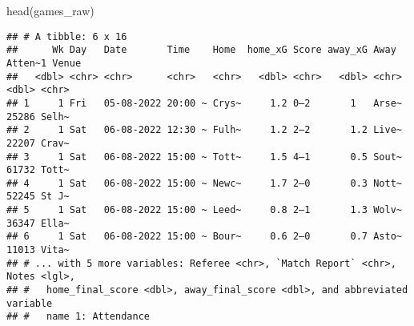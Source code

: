 \documentclass[
]{article}
\newenvironment{Shaded}{\begin{snugshade}}{\end{snugshade}}
\newcommand{\AttributeTok}[1]{\textcolor[rgb]{0.77,0.63,0.00}{#1}}
\newcommand{\FunctionTok}[1]{\textcolor[rgb]{0.00,0.00,0.00}{#1}}
\newcommand{\NormalTok}[1]{#1}
\newcommand{\OtherTok}[1]{\textcolor[rgb]{0.56,0.35,0.01}{#1}}
\newcommand{\SpecialCharTok}[1]{\textcolor[rgb]{0.00,0.00,0.00}{#1}}
\newcommand{\StringTok}[1]{\textcolor[rgb]{0.31,0.60,0.02}{#1}}
\begin{document}
\begin{Shaded}
\begin{Highlighting}[]
\FunctionTok{head}\NormalTok{(games\_raw)}
\end{Highlighting}
\end{Shaded}

\begin{verbatim}
## # A tibble: 6 x 16
##      Wk Day   Date       Time    Home  home_xG Score away_xG Away  Atten~1 Venue
##   <dbl> <chr> <chr>      <chr>   <chr>   <dbl> <chr>   <dbl> <chr>   <dbl> <chr>
## 1     1 Fri   05-08-2022 20:00 ~ Crys~     1.2 0–2       1   Arse~   25286 Selh~
## 2     1 Sat   06-08-2022 12:30 ~ Fulh~     1.2 2–2       1.2 Live~   22207 Crav~
## 3     1 Sat   06-08-2022 15:00 ~ Tott~     1.5 4–1       0.5 Sout~   61732 Tott~
## 4     1 Sat   06-08-2022 15:00 ~ Newc~     1.7 2–0       0.3 Nott~   52245 St J~
## 5     1 Sat   06-08-2022 15:00 ~ Leed~     0.8 2–1       1.3 Wolv~   36347 Ella~
## 6     1 Sat   06-08-2022 15:00 ~ Bour~     0.6 2–0       0.7 Asto~   11013 Vita~
## # ... with 5 more variables: Referee <chr>, `Match Report` <chr>, Notes <lgl>,
## #   home_final_score <dbl>, away_final_score <dbl>, and abbreviated variable
## #   name 1: Attendance
\end{verbatim}

\begin{Shaded}
\end{Shaded}
\end{document}
